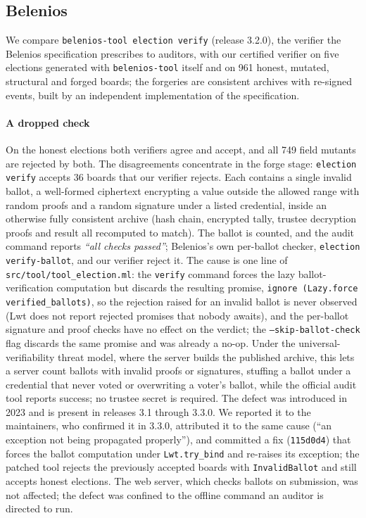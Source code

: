 \subsection{Belenios}\label{sec:cs:belenios}
We compare \texttt{belenios-tool election verify} (release 3.2.0), the
verifier the Belenios specification prescribes to auditors, with our
certified verifier on five elections generated with \texttt{belenios-tool}
itself and on 961 honest, mutated, structural and forged boards; the
forgeries are consistent archives with re-signed events, built by an
independent implementation of the specification.

\paragraph{A dropped check}
On the honest elections both verifiers agree and accept, and all 749
field mutants are rejected by both. The disagreements concentrate in the
forge stage: \texttt{election verify} accepts 36 boards that our verifier
rejects. Each contains a single invalid ballot, a well-formed ciphertext
encrypting a value outside the allowed range with random proofs and a
random signature under a listed credential, inside an otherwise fully
consistent archive (hash chain, encrypted tally, trustee decryption
proofs and result all recomputed to match). The ballot is counted, and
the audit command reports \emph{``all checks passed''}; Belenios's own
per-ballot checker, \texttt{election verify-ballot}, and our verifier
reject it. The cause is one line of \texttt{src/tool/tool\_election.ml}:
the \texttt{verify} command forces the lazy ballot-verification
computation but discards the resulting promise, \texttt{ignore (Lazy.force
verified\_ballots)}, so the rejection raised for an invalid ballot is
never observed (Lwt does not report rejected promises that nobody
awaits), and the per-ballot signature and proof checks have no effect on
the verdict; the \texttt{--skip-ballot-check} flag discards the same
promise and was already a no-op. Under the universal-verifiability threat
model, where the server builds the published archive, this lets a server
count ballots with invalid proofs or signatures, stuffing a ballot under
a credential that never voted or overwriting a voter's ballot, while the
official audit tool reports success; no trustee secret is required. The
defect was introduced in 2023 and is present in releases 3.1 through
3.3.0. We reported it to the maintainers, who confirmed it in 3.3.0,
attributed it to the same cause (``an exception not being propagated
properly''), and committed a fix (\texttt{115d0d4}) that forces the
ballot computation under \texttt{Lwt.try\_bind} and re-raises its
exception; the patched tool rejects the previously accepted boards with
\texttt{InvalidBallot} and still accepts honest elections. The web
server, which checks ballots on submission, was not affected; the defect
was confined to the offline command an auditor is directed to run.

